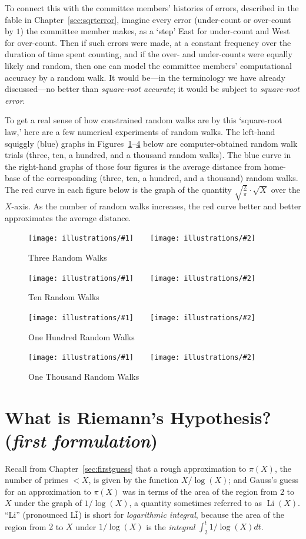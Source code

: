 \documentclass[openany]{book}
\DeclareMathOperator{\Li}{Li}
\newcommand{\illtwo}[4]{%
   \begin{figure}[H]\centering%
   \texttt{[image: illustrations/\#1]}$\qquad$\texttt{[image: illustrations/\#2]}%
   \caption{#4}%
    \end{figure}}
\theoremstyle{plain}
\theoremstyle{definition}
\begin{document}
  To connect this with the committee members' histories of errors, described in the fable in Chapter~\ref{sec:sqrterror}, imagine  every  error (under-count or over-count by $1$) the committee member makes, as a `step' East for under-count and West for over-count. Then if such errors were made, at a constant frequency over the duration of time spent counting, and if the over- and under-counts were equally likely and random, then one can model the committee members' computational  accuracy by a random walk. It would be---in the terminology we have already discussed---no better than {\it square-root accurate}; it would be subject to {\it square-root error}.

   To get a real sense of how constrained random walks are by this `square-root law,' here are a few numerical experiments of random walks. The left-hand squiggly (blue) graphs in Figures~\ref{fig:random_walks_3}--\ref{fig:random_walks_1000} below are computer-obtained random walk trials (three, ten, a hundred, and a thousand random walks). The blue curve in the right-hand graphs of those four figures is the average distance from home-base of the corresponding (three, ten, a hundred, and a thousand) random walks.
The red curve in each figure below is the graph of the quantity $\sqrt{\frac{2}{\pi}}\cdot {\sqrt X}$ over the $X$-axis.
As the number of random walks increases, the red curve
better and better approximates the average distance.

\illtwo{random_walks-3}{random_walks-3-mean}{.45}{Three Random Walks\label{fig:random_walks_3}}

\illtwo{random_walks-10}{random_walks-10-mean}{.45}{Ten Random Walks\label{fig:random_walks_10}}

\illtwo{random_walks-100}{random_walks-100-mean}{.45}{One Hundred Random Walks\label{fig:random_walks_100}}

\illtwo{random_walks-1000}{random_walks-1000-mean}{.45}{One Thousand Random Walks\label{fig:random_walks_1000}}





\chapter[What is Riemann's Hypothesis?] { What is Riemann's Hypothesis?  ({\em first formulation})\label{sec:rh1}}



Recall from Chapter~\ref{sec:firstguess} that a rough approximation to
$\pi(X)$, the number of primes $< X$, is given by the function
$X/\log(X)$; and Gauss's guess for an approximation to $\pi(X)$ was in
terms of the area of the region from $2$ to $X$ under the graph of
$1/\log(X)$, a quantity sometimes referred to as $\Li(X)$.
``Li'' (pronounced L$\overline{\rm i}$) is short for {\em logarithmic integral},
because the area of the region from $2$ to $X$ under $1/\log(X)$
is the {\em integral} $\int_2^t 1/\log(X) dt$.
\end{document}
